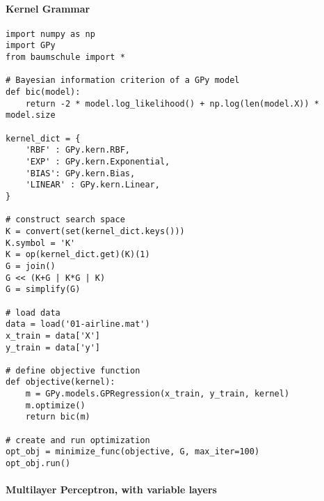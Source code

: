 \documentclass[english]{article}
\begin{document}
\newpage

\paragraph{Kernel Grammar}

\begin{verbatim}
import numpy as np
import GPy
from baumschule import *

# Bayesian information criterion of a GPy model
def bic(model):
    return -2 * model.log_likelihood() + np.log(len(model.X)) * model.size

kernel_dict = {
    'RBF' : GPy.kern.RBF,
    'EXP' : GPy.kern.Exponential,
    'BIAS': GPy.kern.Bias,
    'LINEAR' : GPy.kern.Linear,
}

# construct search space
K = convert(set(kernel_dict.keys()))
K.symbol = 'K'
K = op(kernel_dict.get)(K)(1)
G = join()
G << (K+G | K*G | K)
G = simplify(G)

# load data
data = load('01-airline.mat')
x_train = data['X']
y_train = data['y']

# define objective function
def objective(kernel):
    m = GPy.models.GPRegression(x_train, y_train, kernel)
    m.optimize()
    return bic(m)

# create and run optimization
opt_obj = minimize_func(objective, G, max_iter=100)
opt_obj.run()

\end{verbatim}

\newpage

\paragraph{Multilayer Perceptron, with variable layers}
\end{document}
